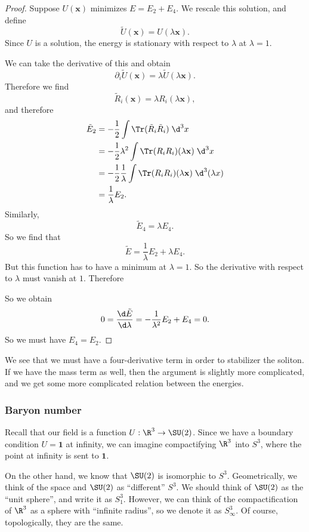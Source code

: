 \documentclass[a4paper]{article}
\begin{document}
\begin{proof}
  Suppose $U(\mathbf{x})$ minimizes $E = E_2 + E_4$. We rescale this solution, and define
  \[
    \tilde{U}(\mathbf{x}) = U(\lambda \mathbf{x}).
  \]
  Since $U$ is a solution, the energy is stationary with respect to $\lambda$ at $\lambda = 1$.

  We can take the derivative of this and obtain
  \[
    \partial_i \tilde{U}(\mathbf{x}) = \lambda \tilde{U}(\lambda \mathbf{x}).
  \]
  Therefore we find
  \[
    \tilde{R}_i(\mathbf{x}) = \lambda R_i(\lambda \mathbf{x}),
  \]
  and therefore
  \begin{align*}
    \tilde{E}_2 &= - \frac{1}{2} \int \Tr(\tilde{R}_i \tilde{R}_i) \;\d^3 x\\
    &= - \frac{1}{2} \lambda^2 \int \Tr(R_i R_i)(\lambda \mathbf{x})\;\d^3 x\\
    &= - \frac{1}{2} \frac{1}{\lambda} \int \Tr(R_i R_i) (\lambda \mathbf{x})\;\d^3 (\lambda x)\\
    &= \frac{1}{\lambda} E_2.
  \end{align*}
  Similarly,
  \[
    \tilde{E}_4 = \lambda E_4.
  \]
  So we find that
  \[
    \tilde{E} = \frac{1}{\lambda} E_2 + \lambda E_4.
  \]
  But this function has to have a minimum at $\lambda = 1$. So the derivative with respect to $\lambda$ must vanish at $1$. Therefore

  So we obtain
  \[
    0 = \frac{\d \tilde{E}}{\d \lambda} = - \frac{1}{\lambda^2}E_2 + E_4 = 0.
  \]
  So we must have $E_4 = E_2$.
\end{proof}

We see that we must have a four-derivative term in order to stabilizer the soliton. If we have the mass term as well, then the argument is slightly more complicated, and we get some more complicated relation between the energies.


\subsubsection*{Baryon number}
Recall that our field is a function $U: \R^3 \to \SU(2)$. Since we have a boundary condition $U = \mathbf{1}$ at infinity, we can imagine compactifying $\R^3$ into $S^3$, where the point at infinity is sent to $\mathbf{1}$.

On the other hand, we know that $\SU(2)$ is isomorphic to $S^3$. Geometrically, we think of the space and $\SU(2)$ as ``different'' $S^3$. We should think of $\SU(2)$ as the ``unit sphere'', and write it as $S^3_1$. However, we can think of the compactification of $\R^3$ as a sphere with ``infinite radius'', so we denote it as $S^3_\infty$. Of course, topologically, they are the same.
\end{document}
